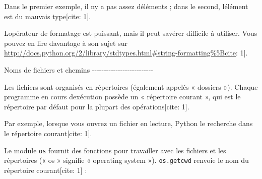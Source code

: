 \begin{Shaded}
\begin{Highlighting}[]
\OperatorTok{\textgreater{}\textgreater{}\textgreater{}} \StringTok{\textquotesingle{}}\StringTok{ }\StringTok{ }\StringTok{\textquotesingle{}} \OperatorTok{\%}\NormalTok{ (}\NormalTok{, }\NormalTok{)}
\NormalTok{: } 
\OperatorTok{\textgreater{}\textgreater{}\textgreater{}} \StringTok{\textquotesingle{}}\StringTok{\textquotesingle{}} \OperatorTok{\%} 
 \OperatorTok{{-}}
\end{Highlighting}
\end{Shaded}

Dans le premier exemple, il n\textquotesingle y a pas assez
d\textquotesingle éléments ; dans le second, l\textquotesingle élément
est du mauvais type{[}cite: 1{]}.

L\textquotesingle opérateur de formatage est puissant, mais il peut
s\textquotesingle avérer difficile à utiliser. Vous pouvez en lire
davantage à son sujet sur
\url{http://docs.python.org/2/library/stdtypes.html\#string-formatting\%5Bcite}:
1{]}.

Noms de fichiers et chemins
-\/-\/-\/-\/-\/-\/-\/-\/-\/-\/-\/-\/-\/-\/-\/-\/-\/-\/-\/-\/-\/-\/-\/-\/-\/-

Les fichiers sont organisés en répertoires (également appelés « dossiers
»). Chaque programme en cours d\textquotesingle exécution possède un «
répertoire courant », qui est le répertoire par défaut pour la plupart
des opérations{[}cite: 1{]}.

Par exemple, lorsque vous ouvrez un fichier en lecture, Python le
recherche dans le répertoire courant{[}cite: 1{]}.

Le module \texttt{os} fournit des fonctions pour travailler avec les
fichiers et les répertoires (« os » signifie « operating system »).
\texttt{os.getcwd} renvoie le nom du répertoire courant{[}cite: 1{]} :

\begin{Shaded}
\begin{Highlighting}[]
\OperatorTok{\textgreater{}\textgreater{}\textgreater{}} 
\OperatorTok{\textgreater{}\textgreater{}\textgreater{}}\OperatorTok{=}
\OperatorTok{\textgreater{}\textgreater{}\textgreater{}} 
\OperatorTok{/}\OperatorTok{/}
\end{Highlighting}
\end{Shaded}

